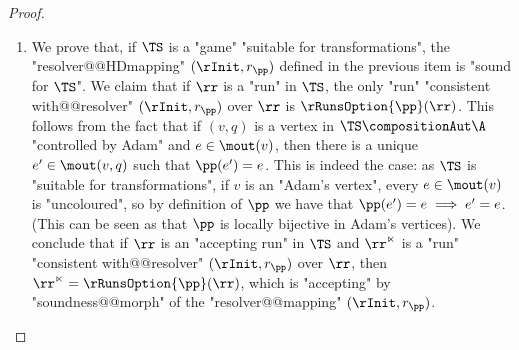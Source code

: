 \documentclass[10pt,a4paper]{amsart}
\begin{document}
\begin{proof}
\begin{enumerate}
		\item We prove that, if $\TS$ is a "game" "suitable for transformations", the "resolver@@HDmapping" $(\rInit, r_\pp)$ defined in the previous item is "sound for $\TS$". We claim that if $\rr$ is a "run" in $\TS$, the only "run" "consistent with@@resolver" $(\rInit, r_\pp)$ over $\rr$ is $\rRunsOption{\pp}(\rr)$. This follows from the fact that if $(v,q)$ is a vertex in $\TS \compositionAut\A$ "controlled by Adam" and $e\in \mout(v)$, then there is a unique $e'\in \mout(v,q)$ such that $\pp(e') = e$. This is indeed the case: as $\TS$ is "suitable for transformations", if $v$ is an "Adam's vertex", every $e\in \mout(v)$ is "uncoloured", so by definition of $\pp$ we have that $\pp(e') = e \implies e'=e$. (This can be seen as that $\pp$ is locally bijective in Adam's vertices).
		We conclude that if $\rr$ is an "accepting run" in $\TS$ and $\rr^\ltimes$ is a "run" "consistent with@@resolver" $(\rInit, r_\pp)$ over $\rr$, then $\rr^\ltimes = \rRunsOption{\pp}(\rr)$, which is "accepting" by "soundness@@morph" of the "resolver@@mapping" $(\rInit, r_\pp)$.\qedhere
	\end{enumerate}	
\end{proof}
\end{document}
